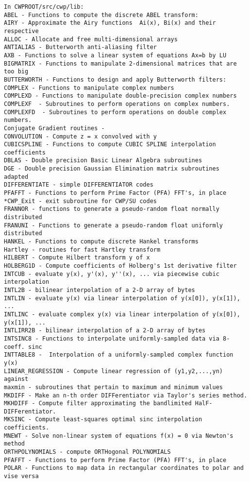 {{\begin{verbatim}
In CWPROOT/src/cwp/lib:
ABEL - Functions to compute the discrete ABEL transform:
AIRY - Approximate the Airy functions  Ai(x), Bi(x) and their respective
ALLOC - Allocate and free multi-dimensional arrays
ANTIALIAS - Butterworth anti-aliasing filter
AXB - Functions to solve a linear system of equations Ax=b by LU
BIGMATRIX - Functions to manipulate 2-dimensional matrices that are too big 
BUTTERWORTH - Functions to design and apply Butterworth filters:
COMPLEX - Functions to manipulate complex numbers
COMPLEXD - Functions to manipulate double-precision complex numbers
COMPLEXF  - Subroutines to perform operations on complex numbers.
COMPLEXFD  - Subroutines to perform operations on double complex numbers.
Conjugate Gradient routines -
CONVOLUTION - Compute z = x convolved with y
CUBICSPLINE - Functions to compute CUBIC SPLINE interpolation coefficients
DBLAS - Double precision Basic Linear Algebra subroutines
DGE - Double precision Gaussian Elimination matrix subroutines  adapted
DIFFERENTIATE - simple DIFFERENTIATOR codes
PFAFFT - Functions to perform Prime Factor (PFA) FFT's, in place
*CWP_Exit - exit subroutine for CWP/SU codes
FRANNOR - functions to generate a pseudo-random float normally distributed
FRANUNI - Functions to generate a pseudo-random float uniformly distributed
HANKEL - Functions to compute discrete Hankel transforms
Hartley - routines for fast Hartley transform
HILBERT - Compute Hilbert transform y of x
HOLBERG1D - Compute coefficients of Holberg's 1st derivative filter
INTCUB - evaluate y(x), y'(x), y''(x), ... via piecewise cubic interpolation
INTL2B - bilinear interpolation of a 2-D array of bytes
INTLIN - evaluate y(x) via linear interpolation of y(x[0]), y(x[1]), ...
INTLINC - evaluate complex y(x) via linear interpolation of y(x[0]), y(x[1]), ...
INTLIRR2B - bilinear interpolation of a 2-D array of bytes
INTSINC8 - Functions to interpolate uniformly-sampled data via 8-coeff. sinc
INTTABLE8 -  Interpolation of a uniformly-sampled complex function y(x)
LINEAR_REGRESSION - Compute linear regression of (y1,y2,...,yn) against 
maxmin - subroutines that pertain to maximum and minimum values
MKDIFF - Make an n-th order DIFFerentiator via Taylor's series method.
MKHDIFF - Compute filter approximating the bandlimited HalF-DIFFerentiator.
MKSINC - Compute least-squares optimal sinc interpolation coefficients.
MNEWT - Solve non-linear system of equations f(x) = 0 via Newton's method
ORTHPOLYNOMIALS - compute ORTHogonal POLYNOMIALS
PFAFFT - Functions to perform Prime Factor (PFA) FFT's, in place
POLAR - Functions to map data in rectangular coordinates to polar and vise versa

\end{verbatim}}}
